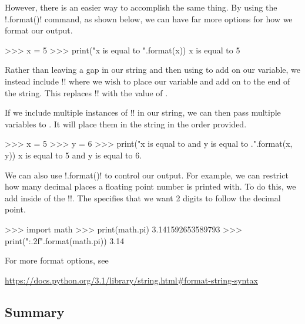 \documentclass[11pt]{cselabheader}
\begin{document}
{However, there is an easier way to accomplish the same thing. By using the
\pythoninline!.format()! command, as shown below, we can have far more options for
how we format our output.

\begin{pyconcode}
>>> x = 5
>>> print("x is equal to {}".format(x))
x is equal to 5
\end{pyconcode}

Rather than leaving a gap in our string and then using \pythoninline{+} to add on
our variable, we instead include \pythoninline!{}! where we wish to place our
variable and add on  to the end of the string. This
replaces \pythoninline!{}! with the value of .

If we include multiple instances of \pythoninline!{}! in our string, we can then
pass multiple variables to . It will place them in the
string in the order provided.

\begin{pyconcode}
>>> x = 5
>>> y = 6
>>> print("x is equal to {} and y is equal to {}.".format(x, y))
x is equal to 5 and y is equal to 6.
\end{pyconcode}

We can also use \pythoninline!.format()! to control our output. For example, we
can restrict how many decimal places a floating point number is printed with. To
do this, we add  inside of the \pythoninline!{}!. The
 specifies that we want 2 digits to follow the decimal point.

\begin{pyconcode}
>>> import math
>>> print(math.pi)
3.141592653589793
>>> print("{:.2f}".format(math.pi))
3.14
\end{pyconcode}

For more format options, see
\begin{center}
  \vspace{-2mm}
  \url{https://docs.python.org/3.1/library/string.html#format-string-syntax}
  \vspace{-2mm}
\end{center}

\subsection{Summary}

}
\end{document}
